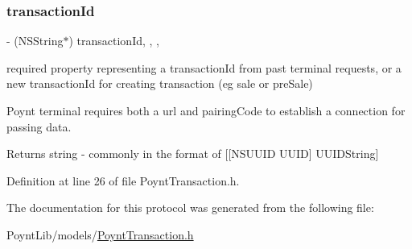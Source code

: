 \subsubsection{\texorpdfstring{transaction\+Id}{transactionId}}
{\footnotesize\ttfamily -\/ (N\+S\+String$\ast$) transaction\+Id\hspace{0.3cm}{\ttfamily [read]}, {\ttfamily [write]}, {\ttfamily [nonatomic]}, {\ttfamily [copy]}}



required property representing a transaction\+Id from past terminal requests, or a new transaction\+Id for creating transaction (eg sale or pre\+Sale) 

Poynt terminal requires both a url and pairing\+Code to establish a connection for passing data.

\begin{DoxyReturn}{Returns}
string -\/ commonly in the format of {\ttfamily }\mbox{[}\mbox{[}N\+S\+U\+U\+ID U\+U\+ID\mbox{]} U\+U\+I\+D\+String\mbox{]} 
\end{DoxyReturn}


Definition at line 26 of file Poynt\+Transaction.\+h.



The documentation for this protocol was generated from the following file\+:\begin{DoxyCompactItemize}
\item 
Poynt\+Lib/models/\hyperlink{_poynt_transaction_8h}{Poynt\+Transaction.\+h}\end{DoxyCompactItemize}
